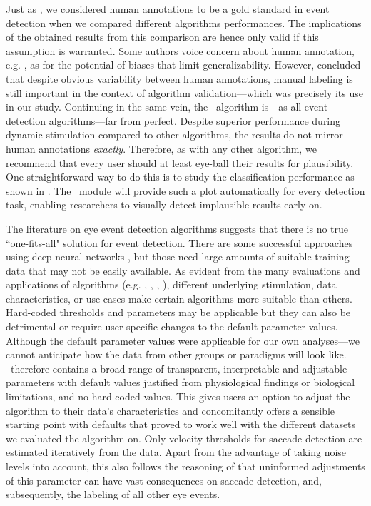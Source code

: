 Just as \cite{Andersson2017}, we considered human annotations to be a gold
standard in event detection when we compared different algorithms performances.
The implications of the obtained results from this comparison are hence only
valid if this assumption is warranted. Some authors voice concern about human
annotation, e.g. \cite{5523936}, as for the potential of biases that limit
generalizability. However, \cite{Hooge2018} concluded that despite obvious
variability between human annotations, manual labeling is still important in the context of algorithm validation---which was precisely its use in our study. Continuing in
the same vein, the \remodnav\ algorithm is---as all event detection algorithms---far from perfect. Despite superior performance during dynamic stimulation
compared to other algorithms, the results do not mirror human annotations
\textit{exactly}. Therefore, as with any other algorithm, we recommend that every user
should at least eye-ball their results for plausibility. One straightforward
way to do this is to study the classification performance as shown in
. The \remodnav\ module will provide such a plot automatically
for every detection task, enabling researchers to visually detect implausible results
early on.

The literature on eye event detection algorithms suggests that there is no true
``one-fits-all" solution for event detection.  There are some successful
approaches using deep neural networks \citep{Startsev2018}, but those need large amounts of suitable training data that may not be easily
available.
As evident from the many evaluations and applications of algorithms (e.g.
\cite{Andersson2017}, \cite{Larsson2013}, \cite{Zemblys2018}, \cite{5523936}),
different underlying stimulation, data characteristics, or use cases make
certain algorithms more suitable than others. Hard-coded thresholds and
parameters may be applicable but they can also be detrimental or require user-specific changes to
the default parameter values. Although the default parameter
values were applicable for our own analyses---we cannot anticipate how the data from other
groups or paradigms will look like.  \remodnav\ therefore contains a broad range of
transparent, interpretable and adjustable parameters with default values
justified from physiological findings or biological limitations, and no
hard-coded values. This gives users an option to adjust the algorithm to their
data's characteristics and concomitantly offers a sensible starting point with defaults that
proved to work well with the different datasets we evaluated the algorithm on.
Only velocity thresholds for saccade detection are estimated iteratively from
the data. Apart from the advantage of taking noise levels into account, this
also follows the reasoning of \cite{Nystrom2010AnData} that uninformed
adjustments of this parameter can have vast consequences on saccade detection,
and, subsequently, the labeling of all other eye events.



